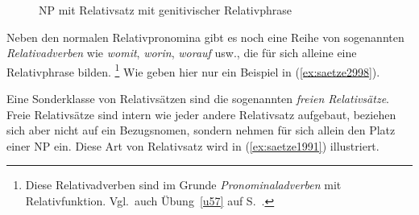 \begin{figure}[!htbp]
  \centering
  \caption{NP mit Relativsatz mit genitivischer Relativphrase}
  \label{fig:saetze5553}
\end{figure}


Neben den normalen Relativpronomina gibt es noch eine Reihe von sogenannten \textit{Relativadverben} wie \textit{womit}, \textit{worin}, \textit{worauf} usw., die für sich alleine eine Relativphrase bilden.%
\footnote{Diese Relativadverben sind im Grunde \textit{Pronominaladverben} mit Relativfunktion.
Vgl.\ auch Übung~\ref{u57} auf S.~\pageref{u57}.}
Wie geben hier nur ein Beispiel in (\ref{ex:saetze2998}).

\begin{exe}
\end{exe}

Eine Sonderklasse von Relativsätzen sind die sogenannten \textit{freien Relativsätze}.
Freie Relativsätze sind intern wie jeder andere Relativsatz aufgebaut, beziehen sich aber nicht auf ein Bezugsnomen, sondern nehmen für sich allein den Platz einer NP ein.
Diese Art von Relativsatz wird in (\ref{ex:saetze1991}) illustriert.


\begin{exe}
  \ex\label{ex:saetze1991}
  \begin{xlist}
  \end{xlist}
\end{exe}

